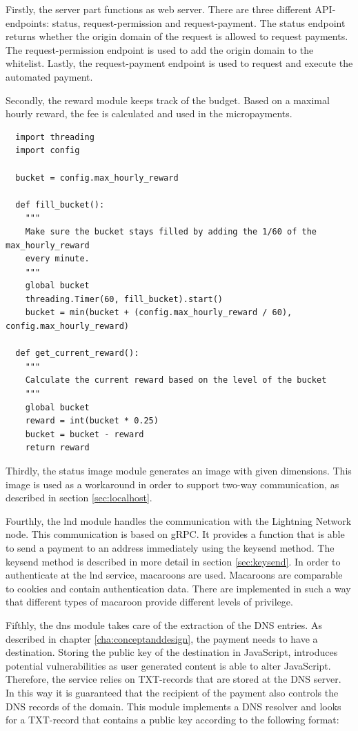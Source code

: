 Firstly, the server part functions as web server. There are three different API-endpoints: status, request-permission and request-payment. The status endpoint returns whether the origin domain of the request is allowed to request payments. The request-permission endpoint is used to add the origin domain to the whitelist. Lastly, the request-payment endpoint is used to request and execute the automated payment.

Secondly, the reward module keeps track of the budget. Based on a maximal hourly reward, the fee is calculated and used in the micropayments.


\lstset{language=Python}
\lstset{frame=lines}
\lstset{basicstyle=\footnotesize}
\begin{lstlisting}
  import threading
  import config
  
  bucket = config.max_hourly_reward
  
  def fill_bucket():
    """
    Make sure the bucket stays filled by adding the 1/60 of the max_hourly_reward
    every minute.
    """
    global bucket
    threading.Timer(60, fill_bucket).start()
    bucket = min(bucket + (config.max_hourly_reward / 60), config.max_hourly_reward)
  
  def get_current_reward():
    """
    Calculate the current reward based on the level of the bucket
    """
    global bucket
    reward = int(bucket * 0.25)
    bucket = bucket - reward
    return reward
\end{lstlisting}

Thirdly, the status image module generates an image with given dimensions. This image is used as a workaround in order to support two-way communication, as described in section \ref{sec:localhost}.

Fourthly, the lnd module handles the communication with the Lightning Network node. This communication is based on gRPC. It provides a function that is able to send a payment to an address immediately using the keysend method. The keysend method is described in more detail in section \ref{sec:keysend}. In order to authenticate at the lnd service, macaroons are used. Macaroons are comparable to cookies and contain authentication data. There are implemented in such a way that different types of macaroon provide different levels of privilege. 

Fifthly, the dns module takes care of the extraction of the DNS entries. As described in chapter \ref{cha:conceptanddesign}, the payment needs to have a destination. Storing the public key of the destination in JavaScript, introduces potential vulnerabilities as user generated content is able to alter JavaScript. Therefore, the service relies on TXT-records that are stored at the DNS server. In this way it is guaranteed that the recipient of the payment also controls the DNS records of the domain. This module implements a DNS resolver and looks for a TXT-record that contains a public key according to the following format:

